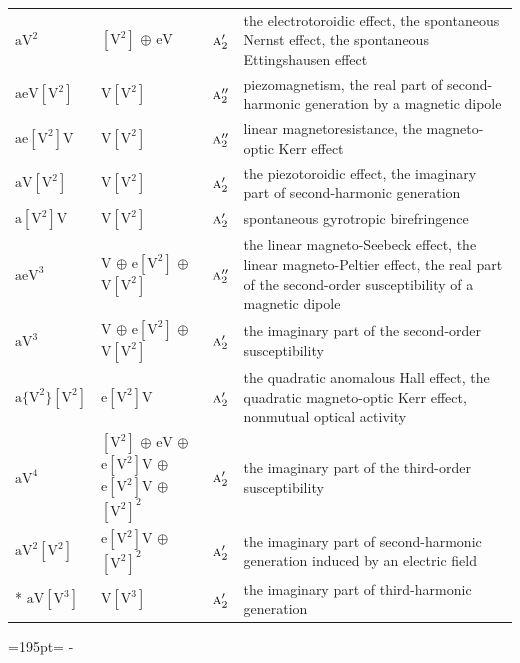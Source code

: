 \documentclass[10pt,a4paper]{article}
\newcommand{\needspace}[1]{\par\penalty-100\begingroup\dimen0=#1\relax\dimen2=\pagegoal
  \advance\dimen2-\pagetotal\ifdim\dimen0>\dimen2\relax\ifdim\dimen2>0pt\vfil\break\fi\fi
  \endgroup}
\numberwithin{equation}{section}
\newcommand{\irr}[1]{\text{\normalfont\scshape #1}}
\newcommand{\jahn}[1]{\mathrm{#1}}
\newlength{\fillwidth}\newlength{\cellwidth}\newlength{\colwidth}
\begin{document}
{\begin{longtable}{@{}lll>{\RaggedRight\arraybackslash}p{\fillwidth}@{}}
$\jahn{aV^{2}}$ & $\jahn{[V^{2}]}$ $\oplus$ $\jahn{eV}$ & $\irr{a}_{2}'$ & the electrotoroidic effect, the spontaneous Nernst effect, the spontaneous Ettingshausen effect\\
$\jahn{aeV[V^{2}]}$ & $\jahn{V[V^{2}]}$ & $\irr{a}_{2}''$ & piezomagnetism, the real part of second-harmonic generation by a magnetic dipole\\
$\jahn{ae[V^{2}]V}$ & $\jahn{V[V^{2}]}$ & $\irr{a}_{2}''$ & linear magnetoresistance, the magneto-optic Kerr effect\\
$\jahn{aV[V^{2}]}$ & $\jahn{V[V^{2}]}$ & $\irr{a}_{2}'$ & the piezotoroidic effect, the imaginary part of second-harmonic generation\\
$\jahn{a[V^{2}]V}$ & $\jahn{V[V^{2}]}$ & $\irr{a}_{2}'$ & spontaneous gyrotropic birefringence\\
$\jahn{aeV^{3}}$ & $\jahn{V}$ $\oplus$ $\jahn{e[V^{2}]}$ $\oplus$ $\jahn{V[V^{2}]}$ & $\irr{a}_{2}''$ & the linear magneto-Seebeck effect, the linear magneto-Peltier effect, the real part of the second-order susceptibility of a magnetic dipole\\
$\jahn{aV^{3}}$ & $\jahn{V}$ $\oplus$ $\jahn{e[V^{2}]}$ $\oplus$ $\jahn{V[V^{2}]}$ & $\irr{a}_{2}'$ & the imaginary part of the second-order susceptibility\\
$\jahn{a\{V^{2}\}[V^{2}]}$ & $\jahn{e[V^{2}]V}$ & $\irr{a}_{2}'$ & the quadratic anomalous Hall effect, the quadratic magneto-optic Kerr effect, nonmutual optical activity\\
$\jahn{aV^{4}}$ & $\jahn{[V^{2}]}$ $\oplus$ $\jahn{eV}$ $\oplus$ $\jahn{e[V^{2}]V}$ $\oplus$ $\jahn{e[V^{2}]V}$ $\oplus$ $\jahn{[V^{2}]^{2}}$ & $\irr{a}_{2}'$ & the imaginary part of the third-order susceptibility\\
$\jahn{aV^{2}[V^{2}]}$ & $\jahn{e[V^{2}]V}$ $\oplus$ $\jahn{[V^{2}]^{2}}$ & $\irr{a}_{2}'$ & the imaginary part of second-harmonic generation induced by an electric field\\*
$\jahn{aV[V^{3}]}$ & $\jahn{V[V^{3}]}$ & $\irr{a}_{2}'$ & the imaginary part of third-harmonic generation\\
\bottomrule\end{longtable}}
\needspace{195pt}
\end{document}
